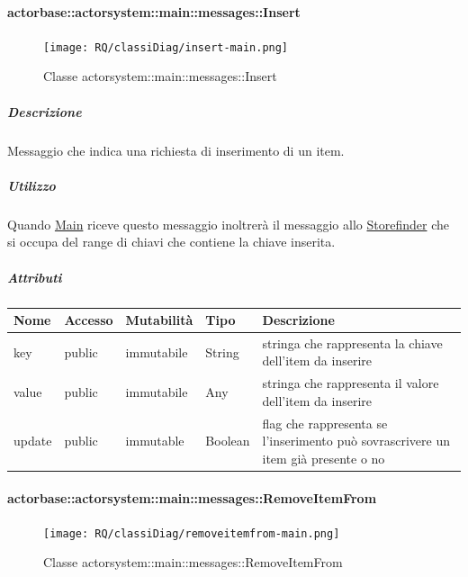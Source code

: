 \documentclass{scalatekids-article}
\begin{document}
\paragraph{actorbase::actorsystem::main::messages::Insert}
\label{sec:actorbase::actorsystem::main::messages::Insert}

\begin{figure}[H]
   \begin{center}
     \texttt{[image: RQ/classiDiag/insert-main.png]}
     \caption{Classe actorsystem::main::messages::Insert}
   \end{center}
 \end{figure}

\subparagraph{Descrizione}
Messaggio che indica una richiesta di inserimento di un item.

\subparagraph{Utilizzo}

Quando \hyperref[sec:actorbase::actorsystem::main::Main]{Main}
riceve questo messaggio inoltrerà il messaggio allo \hyperref[sec:actorbase::actorsystem::storefinder::Storefinder]{Storefinder}
che si occupa del range di chiavi che contiene la chiave inserita.

\subparagraph{Attributi}
\begin{tabular}{| p{3cm} | p{1.5cm} | p{2cm} | p{2cm} | p{8.5cm} |}
  \hline
  Nome & Accesso & Mutabilità & Tipo & Descrizione\\
  \hline
  key & public & immutabile & String & stringa che rappresenta la chiave dell'item da inserire \\
  \hline
  value & public & immutabile & Any & stringa che rappresenta il valore dell'item da inserire \\
  \hline
  update & public & immutable & Boolean & flag che rappresenta se l'inserimento può sovrascrivere un item già presente o no \\
  \hline
\end{tabular}

\paragraph{actorbase::actorsystem::main::messages::RemoveItemFrom}
\label{sec:actorbase::actorsystem::main::messages::RemoveItemFrom}

\begin{figure}[H]
   \begin{center}
     \texttt{[image: RQ/classiDiag/removeitemfrom-main.png]}
     \caption{Classe actorsystem::main::messages::RemoveItemFrom}
   \end{center}
 \end{figure}
\end{document}
